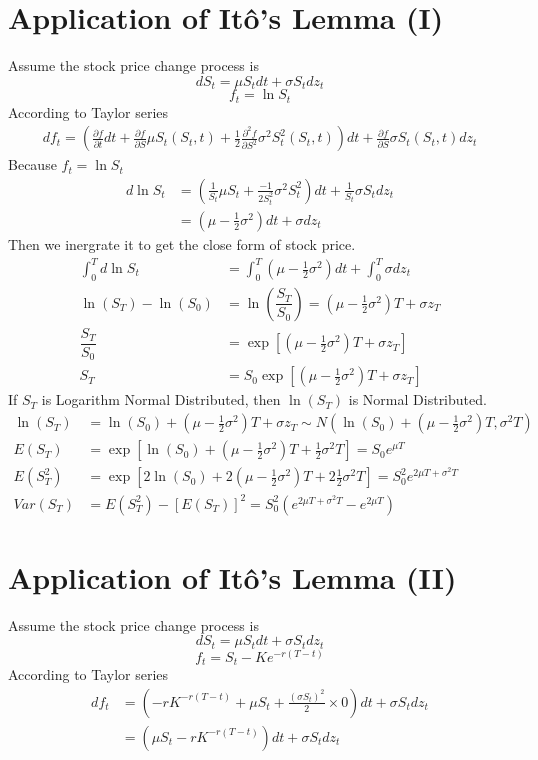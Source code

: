 \documentclass[12pt]{article}
\begin{document}
\section{Application of It\^o's Lemma (I)}
Assume the stock price change process is
\[
    dS_t = \mu S_t dt + \sigma S_t dz_t  
\]
\[
    f_t = \ln S_t
\]  
According to Taylor series
\begin{align*}
    df_t = (\frac{\partial f}{\partial t}dt+\frac{\partial f}{\partial S}\mu S_t(S_t, t)+\frac{1}{2}\frac{\partial^2f}{\partial S^2}\sigma^2 S_t^2(S_t, t))dt + \frac{\partial f}{\partial S}\sigma S_t(S_t, t)dz_t
\end{align*}
Because $f_t = \ln S_t$
\begin{align*}
    d\ln S_t &= (\frac{1}{S_t}\mu S_t + \frac{-1}{2S_t^2}\sigma^2S_t^2)dt + \frac{1}{S_t}\sigma S_t dz_t\\
    &= (\mu - \frac{1}{2}\sigma^2)dt + \sigma dz_t
\end{align*}
Then we inergrate it to get the close form of stock price.
\begin{align*}
   \int_0^T d\ln S_t &= \int_0^T (\mu - \frac{1}{2}\sigma^2)dt + \int_0^T \sigma dz_t\\
   \ln(S_T)-\ln(S_0) &= \ln(\dfrac{S_T}{S_0}) = (\mu-\frac{1}{2}\sigma^2)T + \sigma z_T\\
   \dfrac{S_T}{S_0} &= \exp{[(\mu-\frac{1}{2}\sigma^2)T + \sigma z_T]}\\
   S_T &= S_0\exp{[(\mu-\frac{1}{2}\sigma^2)T + \sigma z_T]} 
\end{align*}
If $S_T$ is Logarithm Normal Distributed, then $\ln(S_T)$ is Normal Distributed.\\ 
\begin{align*}
    \ln(S_T) &= \ln(S_0) + (\mu-\frac{1}{2}\sigma^2)T + \sigma z_T\sim N(\ln(S_0) + (\mu-\frac{1}{2}\sigma^2)T, \sigma^2 T)\\
    E(S_T) &= \exp[\ln(S_0) + (\mu-\frac{1}{2}\sigma^2)T + \frac{1}{2}\sigma^2 T] = S_0e^{\mu T}\\
    E(S_T^2) &= \exp[2\ln(S_0) + 2(\mu-\frac{1}{2}\sigma^2)T + 2\frac{1}{2}\sigma^2 T] = S_0^2e^{2\mu T + \sigma^2 T}\\
    Var(S_T) &= E(S_T^2) - [E(S_T)]^2 = S_0^2(e^{2\mu T + \sigma^2 T} - e^{2\mu T})
\end{align*}
\newpage

\section{Application of It\^o's Lemma (II)}
Assume the stock price change process is
\[
    dS_t = \mu S_t dt + \sigma S_t dz_t  
\]
\[
    f_t = S_t - Ke^{-r(T-t)}
\]  
According to Taylor series
\begin{align*}
    df_t &= (-rK^{-r(T-t)} + \mu S_t + \frac{(\sigma S_t)^2}{2}\times 0)dt + \sigma S_t dz_t\\
    &= (\mu S_t - rK^{-r(T-t)})dt + \sigma S_t dz_t
\end{align*}
\end{document}
